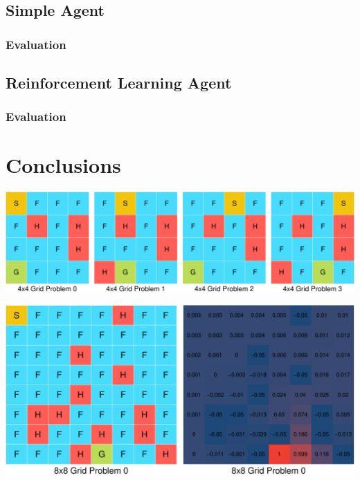 \documentclass[11pt,]{article}
\begin{document}
\subsection{Simple Agent}\label{simple-agent}

\subsubsection{Evaluation}\label{evaluation-1}

\subsection{Reinforcement Learning
Agent}\label{reinforcement-learning-agent}

\subsubsection{Evaluation}\label{evaluation-2}

\section{Conclusions}\label{sec:con}

\begin{center}\includegraphics[width=0.9\linewidth]{project_files/figure-latex/lakes-1} \end{center}

\begin{center}\includegraphics[width=1\linewidth]{project_files/figure-latex/lakes3-1} \end{center}
\end{document}
